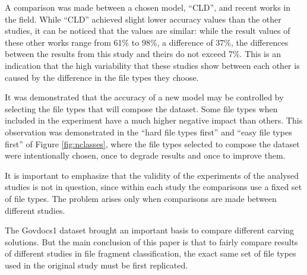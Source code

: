 A comparison was made between a chosen model, ``CLD'', and recent works in the field. While ``CLD'' achieved slight lower accuracy values than the other studies, it can be noticed that the values are similar:
while the result values of these other works range from 61\% to 98\%, a difference of 37\%, the differences between the results from this study and theirs do not exceed 7\%. This is an indication that the high  variability that these studies show between each other is caused by the difference in the file types they choose.

It was demonstrated that the accuracy of a new model may be controlled by selecting the file types that will compose the dataset. 
Some file types when included in the experiment have a much higher negative impact than others. This observation was demonstrated in the ``hard file types first'' and ``easy file types first'' of Figure \ref{fig:nclasses}, where the file types selected to compose the dataset were intentionally chosen, once to degrade results and once to improve them.


It is important to emphasize that the validity of the experiments of the analysed studies is not in question, since within each study the comparisons use a fixed set of file types. The problem arises only when comparisons are made between different studies.

The Govdocs1 dataset brought an important basis to compare different carving solutions. But the main conclusion of this paper is that to fairly compare results of different studies in file fragment classification, the exact same set of file types used in the original study must be first replicated.
